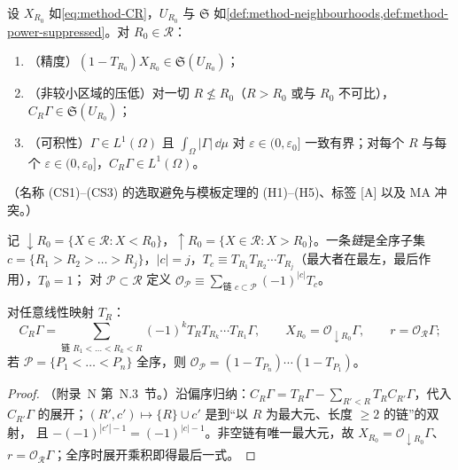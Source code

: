 \begin{definition}[减除条件 (CS1)--(CS3)]\label{def:method-collins-conditions}
设 $X_{R_0}$ 如\cref{eq:method-CR}，$U_{R_0}$ 与 $\mathfrak S$ 如\cref{def:method-neighbourhoods,def:method-power-suppressed}。对 $R_0\in\mathcal R$：
\begin{enumerate}[leftmargin=4.4em,labelwidth=4em,itemsep=1pt,topsep=2pt]
\item[\textbf{(CS1)}$_{R_0}$]（精度）$(1-T_{R_0})X_{R_0}\in\mathfrak S(U_{R_0})$；
\item[\textbf{(CS2)}$_{R_0}$]（非较小区域的压低）对一切 $R\not\le R_0$（$R>R_0$ 或与 $R_0$ 不可比），$C_R\Gamma\in\mathfrak S(U_{R_0})$；
\item[\textbf{(CS3)}]（可积性）$\Gamma\in L^1(\Omega)$ 且 $\int_\Omega|\Gamma|\,\dd\mu$ 对 $\varepsilon\in(0,\varepsilon_0]$ 一致有界；对每个 $R$ 与每个 $\varepsilon\in(0,\varepsilon_0]$，$C_R\Gamma\in L^1(\Omega)$。
\end{enumerate}
（名称 (CS1)--(CS3) 的选取避免与模板定理的 (H1)--(H5)、标签 [A] 以及 MA 冲突。）
\end{definition}

记 $\downarrow R_0=\{X\in\mathcal R:X<R_0\}$，$\uparrow R_0=\{X\in\mathcal R:X>R_0\}$。一条\emph{链}是全序子集 $c=\{R_1>R_2>\dots>R_j\}$，$|c|=j$，$T_c\equiv T_{R_1}T_{R_2}\cdots T_{R_j}$（最大者在最左，最后作用），$T_\emptyset=1$；
对 $\mathcal P\subset\mathcal R$ 定义 $\mathcal O_{\mathcal P}\equiv\sum_{\text{链 }c\subset\mathcal P}(-1)^{|c|}T_c$。

\begin{proposition}[减除的链展开]\label{prop:method-chains}
对任意线性映射 $T_R$：
\begin{equation}\label{eq:method-chains}
C_R\Gamma=\sum_{\text{链 }R_1<\dots<R_k<R}(-1)^kT_RT_{R_k}\cdots T_{R_1}\Gamma,\qquad X_{R_0}=\mathcal O_{\downarrow R_0}\Gamma,\qquad r=\mathcal O_{\mathcal R}\Gamma ;
\end{equation}
若 $\mathcal P=\{P_1<\dots<P_n\}$ 全序，则 $\mathcal O_{\mathcal P}=(1-T_{P_n})\cdots(1-T_{P_1})$。
\end{proposition}

\begin{proof}
（附录~N 第~N.3~节。）沿偏序归纳：$C_R\Gamma=T_R\Gamma-\sum_{R'<R}T_RC_{R'}\Gamma$，代入 $C_{R'}\Gamma$ 的展开；$(R',c')\mapsto\{R\}\cup c'$ 是到“以 $R$ 为最大元、长度 $\ge2$ 的链”的双射，
且 $-(-1)^{|c'|-1}=(-1)^{|c|-1}$。非空链有唯一最大元，故 $X_{R_0}=\mathcal O_{\downarrow R_0}\Gamma$、$r=\mathcal O_{\mathcal R}\Gamma$；全序时展开乘积即得最后一式。
\end{proof}

